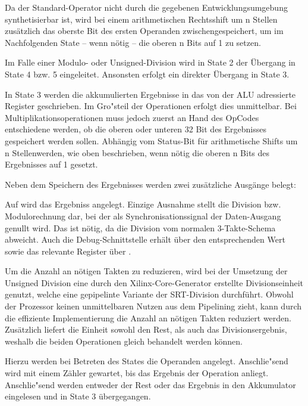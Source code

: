 Da der Standard-Operator  nicht durch die gegebenen Entwicklungsumgebung synthetisierbar ist, wird bei einem arithmetischen Rechtsshift um {n} Stellen zusätzlich das oberste Bit des ersten Operanden zwischengespeichert, um im Nachfolgenden State – wenn n\"otig – die oberen {n} Bits auf {1} zu setzen.\vspace{10pt}

Im Falle einer Modulo- oder Unsigned-Division wird in State 2 der \"Ubergang in State 4 bzw. 5 eingeleitet. Ansonsten erfolgt ein direkter \"Ubergang in State 3.

In State 3 werden die akkumulierten Ergebnisse in das von der ALU adressierte Register geschrieben.
Im Gro"steil der Operationen erfolgt dies unmittelbar. Bei Multiplikationsoperationen muss jedoch zuerst an Hand des OpCodes entschiedene werden, ob die oberen oder unteren 32 Bit des Ergebnisses gespeichert werden sollen. Abhängig vom Status-Bit f\"ur arithmetische Shifts um {n} Stellenwerden, wie oben beschrieben, wenn n\"otig die oberen n Bits des Ergebnisses auf {1} gesetzt.\vspace{10pt}

Neben dem Speichern des Ergebnisses werden zwei zusätzliche Ausgänge belegt:

Auf  wird das Ergebniss angelegt. Einzige Ausnahme stellt die Division bzw. Modulorechnung dar, bei der als Synchronisationssignal der Daten-Ausgang genullt wird. Das ist n\"otig, da die Division vom normalen 3-Takte-Schema abweicht.
Auch die Debug-Schnittstelle erhält \"uber  den entsprechenden Wert sowie das relevante Register \"uber .

Um die Anzahl an n\"otigen Takten zu reduzieren, wird bei der Umsetzung der Unsigned Division eine durch den Xilinx-Core-Generator erstellte Divisionseinheit genutzt, welche eine gepipelinte Variante der SRT-Division durchf\"uhrt. Obwohl der Prozessor keinen unmittelbaren Nutzen aus dem Pipelining zieht, kann durch die effiziente Implementierung die Anzahl an n\"otigen Takten reduziert werden. Zusätzlich liefert die Einheit sowohl den Rest, als auch das Divisionsergebnis, weshalb die beiden Operationen gleich behandelt werden k\"onnen.

Hierzu werden bei Betreten des States die Operanden angelegt. Anschlie"send wird mit einem Zähler gewartet, bis das Ergebnis der Operation anliegt.
Anschlie"send werden entweder der Rest oder das Ergebnis in den Akkumulator eingelesen und in State 3 \"ubergegangen.

